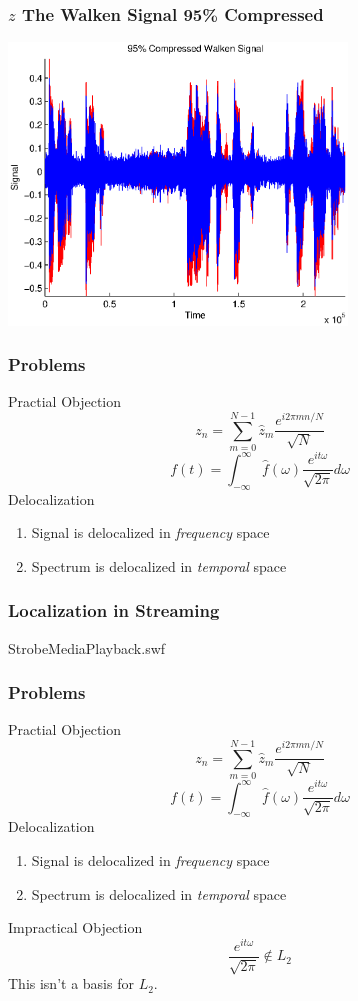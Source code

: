 \documentclass[10pt]{beamer}
\begin{document}
\begin{frame}
\frametitle{$z$ The Walken Signal 95\% Compressed}
\includegraphics[height=7.5cm]{95fourRec.eps}
\end{frame}

\begin{frame}
\frametitle{Problems}
\begin{block}{Practial Objection}
$$
z_n=\sum^{N-1}_{m=0} \hat z_m \frac{e^{i2\pi mn/N}}{\sqrt N}
$$
$$
f(t)=\int^\infty_{-\infty} \hat f (\omega)  \frac{e^{it\omega}}{\sqrt{2\pi}}d\omega
$$
Delocalization
\begin{enumerate}
\item Signal is delocalized in \emph{frequency} space
\item Spectrum is delocalized in \emph{temporal} space
\end{enumerate}
\end{block}
\end{frame}

\begin{frame}
\frametitle{Localization in Streaming}
\center
{}
{StrobeMediaPlayback.swf}
\end{frame}

\begin{frame}
\frametitle{Problems}
\begin{block}{Practial Objection}
$$
z_n=\sum^{N-1}_{m=0} \hat z_m \frac{e^{i2\pi mn/N}}{\sqrt N}
$$
$$
f(t)=\int^\infty_{-\infty} \hat f (\omega)  \frac{e^{it\omega}}{\sqrt{2\pi}}d\omega
$$
Delocalization
\begin{enumerate}
\item Signal is delocalized in \emph{frequency} space
\item Spectrum is delocalized in \emph{temporal} space
\end{enumerate}
\end{block}
\pause
\begin{block}
{Impractical Objection}
$$
\frac{e^{it\omega}}{\sqrt{2\pi}} \notin L_2
$$
This isn't a basis for $L_2$.
\end{block}
\end{frame}
\end{document}
